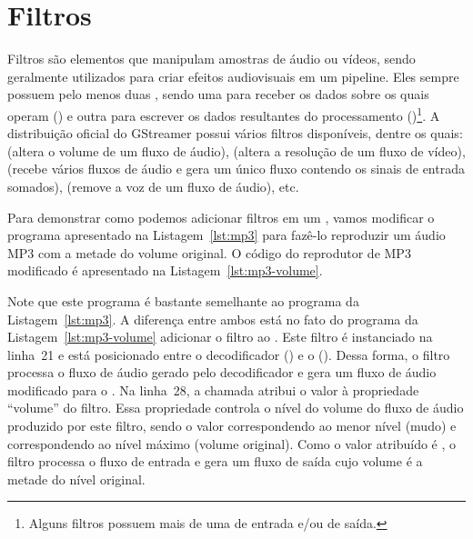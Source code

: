 \section{Filtros}
\label{sec:filtros}
Filtros são elementos que manipulam amostras de áudio ou vídeos, sendo 
geralmente utilizados para criar efeitos audiovisuais em um pipeline. Eles
sempre possuem pelo menos duas , sendo uma para receber os dados
sobre os quais operam () e outra para escrever os dados 
resultantes do processamento ()\footnote{Alguns filtros possuem 
  mais de uma  de entrada e/ou de saída.}. A distribuição oficial do
GStreamer possui vários filtros disponíveis, dentre os quais: 
(altera o volume de um fluxo de áudio),  (altera a resolução de
um fluxo de vídeo),  (recebe vários fluxos de áudio e gera um único 
fluxo contendo os sinais de entrada somados),  (remove a voz
de um fluxo de áudio), etc.

Para demonstrar como podemos adicionar filtros em um , vamos 
modificar o programa apresentado na Listagem~\ref{lst:mp3} para fazê-lo 
reproduzir um áudio MP3 com a metade do volume original. O código do reprodutor
de MP3 modificado é apresentado na Listagem~\ref{lst:mp3-volume}.



Note que este programa é bastante semelhante ao programa da
Listagem~\ref{lst:mp3}. A diferença entre ambos está no fato do programa da
Listagem~\ref{lst:mp3-volume} adicionar o filtro  ao 
. Este filtro é instanciado na linha~21 e está posicionado 
entre o decodificador () e o  (). 
Dessa forma, o filtro  processa o fluxo de áudio
gerado pelo decodificador e gera um fluxo de áudio modificado para o 
. Na linha~28, a chamada  atribui o valor  
à propriedade ``volume'' do filtro. Essa propriedade controla o nível do 
volume do fluxo de áudio produzido por este filtro, sendo o valor  
correspondendo ao menor nível (mudo) e  correspondendo ao nível 
máximo  (volume original). Como o valor atribuído é , o filtro 
processa o fluxo de entrada e gera um fluxo de saída cujo volume é a metade 
do nível original.

